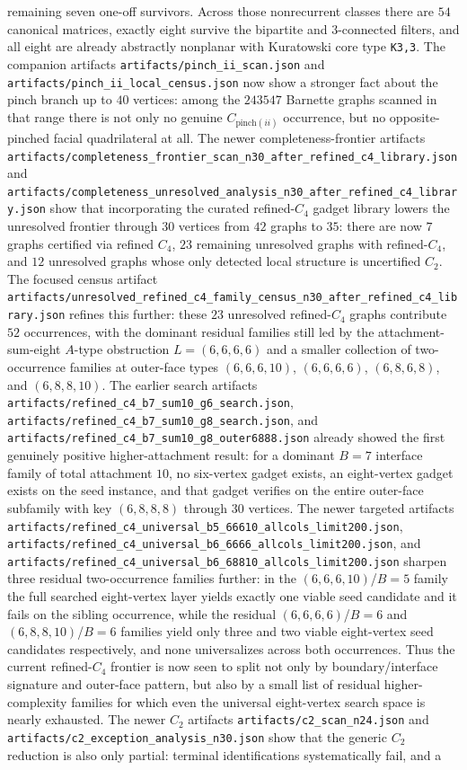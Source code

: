 \documentclass[12pt]{article}
\theoremstyle{definition}
\begin{document}
remaining seven one-off survivors. Across those nonrecurrent classes there are $54$ canonical matrices, exactly eight survive the bipartite and $3$-connected filters, and all eight are already abstractly nonplanar with Kuratowski core type \texttt{K3,3}. The companion artifacts \texttt{artifacts/pinch\_ii\_scan.json} and \texttt{artifacts/pinch\_ii\_local\_census.json} now show a stronger fact about the pinch branch up to $40$ vertices: among the $243547$ Barnette graphs scanned in that range there is not only no genuine $C_{\text{pinch}(ii)}$ occurrence, but no opposite-pinched facial quadrilateral at all. The newer completeness-frontier artifacts \texttt{artifacts/completeness\_frontier\_scan\_n30\_after\_refined\_c4\_library.json} and \texttt{artifacts/completeness\_unresolved\_analysis\_n30\_after\_refined\_c4\_library.json} show that incorporating the curated refined-$C_4$ gadget library lowers the unresolved frontier through $30$ vertices from $42$ graphs to $35$: there are now $7$ graphs certified via refined $C_4$, $23$ remaining unresolved graphs with refined-$C_4$, and $12$ unresolved graphs whose only detected local structure is uncertified $C_2$. The focused census artifact \texttt{artifacts/unresolved\_refined\_c4\_family\_census\_n30\_after\_refined\_c4\_library.json} refines this further: these $23$ unresolved refined-$C_4$ graphs contribute $52$ occurrences, with the dominant residual families still led by the attachment-sum-eight $A$-type obstruction $L=(6,6,6,6)$ and a smaller collection of two-occurrence families at outer-face types $(6,6,6,10)$, $(6,6,6,6)$, $(6,8,6,8)$, and $(6,8,8,10)$. The earlier search artifacts \texttt{artifacts/refined\_c4\_b7\_sum10\_g6\_search.json}, \texttt{artifacts/refined\_c4\_b7\_sum10\_g8\_search.json}, and \texttt{artifacts/refined\_c4\_b7\_sum10\_g8\_outer6888.json} already showed the first genuinely positive higher-attachment result: for a dominant $B=7$ interface family of total attachment $10$, no six-vertex gadget exists, an eight-vertex gadget exists on the seed instance, and that gadget verifies on the entire outer-face subfamily with key $(6,8,8,8)$ through $30$ vertices. The newer targeted artifacts \texttt{artifacts/refined\_c4\_universal\_b5\_66610\_allcols\_limit200.json}, \texttt{artifacts/refined\_c4\_universal\_b6\_6666\_allcols\_limit200.json}, and \texttt{artifacts/refined\_c4\_universal\_b6\_68810\_allcols\_limit200.json} sharpen three residual two-occurrence families further: in the $(6,6,6,10)$/$B=5$ family the full searched eight-vertex layer yields exactly one viable seed candidate and it fails on the sibling occurrence, while the residual $(6,6,6,6)$/$B=6$ and $(6,8,8,10)$/$B=6$ families yield only three and two viable eight-vertex seed candidates respectively, and none universalizes across both occurrences. Thus the current refined-$C_4$ frontier is now seen to split not only by boundary/interface signature and outer-face pattern, but also by a small list of residual higher-complexity families for which even the universal eight-vertex search space is nearly exhausted. The newer $C_2$ artifacts \texttt{artifacts/c2\_scan\_n24.json} and \texttt{artifacts/c2\_exception\_analysis\_n30.json} show that the generic $C_2$ reduction is also only partial: terminal identifications systematically fail, and a 
\end{document}
